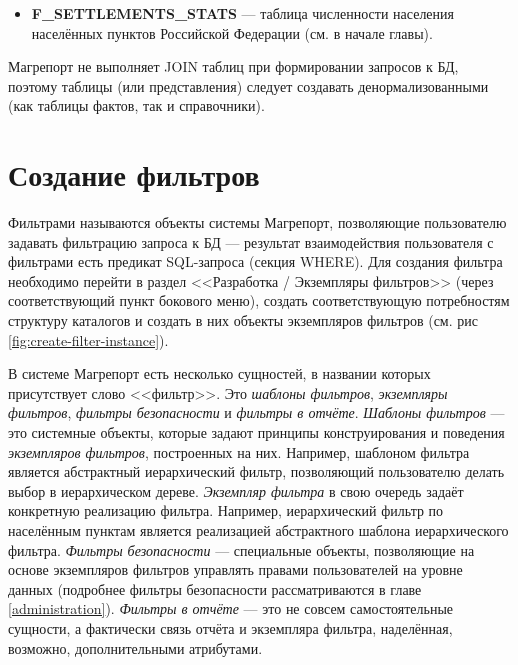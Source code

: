 \documentclass[../user-manual.tex]{subfiles}
\begin{document}
\begin{modelExample}
\begin{itemize}
			\item \textbf{F\_SETTLEMENTS\_STATS} --- таблица численности населения населённых пунктов Российской Федерации (см. в начале главы).
			
		\end{itemize}
	\end{modelExample}

	\begin{concept}
		Магрепорт не выполняет JOIN таблиц при формировании запросов к БД, поэтому таблицы (или представления) следует создавать денормализованными (как таблицы фактов, так и справочники).
	\end{concept}
	
	\section{Создание фильтров}\label{developing:filters}
	
	Фильтрами называются объекты системы Магрепорт, позволяющие пользователю задавать фильтрацию запроса к БД --- результат взаимодействия пользователя с фильтрами есть предикат SQL-запроса (секция WHERE). Для создания фильтра необходимо перейти в раздел <<Разработка / Экземпляры фильтров>> (через соответствующий пункт бокового меню), создать соответствующую потребностям структуру каталогов и создать в них объекты экземпляров фильтров (см. рис \ref{fig:create-filter-instance}).
	
	\begin{concept}
		В системе Магрепорт есть несколько сущностей, в названии которых присутствует слово <<фильтр>>. Это \textit{шаблоны фильтров}, \textit{экземпляры фильтров}, \textit{фильтры безопасности} и \textit{фильтры в отчёте}. \textit{Шаблоны фильтров} --- это системные объекты, которые задают принципы конструирования и поведения \textit{экземпляров фильтров}, построенных на них. Например, шаблоном фильтра является абстрактный иерархический фильтр, позволяющий пользователю делать выбор в иерархическом дереве. \textit{Экземпляр фильтра} в свою очередь задаёт конкретную реализацию фильтра. Например, иерархический фильтр по населённым пунктам является реализацией абстрактного шаблона иерархического фильтра. \textit{Фильтры безопасности} --- специальные объекты, позволяющие на основе экземпляров фильтров управлять правами пользователей на уровне данных (подробнее фильтры безопасности рассматриваются в главе \ref{administration}). \textit{Фильтры в отчёте} --- это не совсем самостоятельные сущности, а фактически связь отчёта и экземпляра фильтра, наделённая, возможно, дополнительными атрибутами.
	\end{concept}
\end{document}

